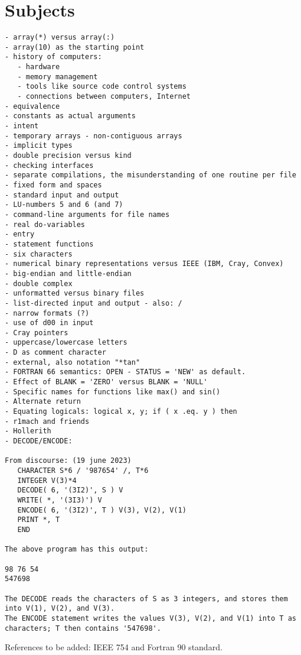 \documentclass{article}
\begin{document}
\section{Subjects}
\begin{verbatim}
- array(*) versus array(:)
- array(10) as the starting point
- history of computers:
   - hardware
   - memory management
   - tools like source code control systems
   - connections between computers, Internet
- equivalence
- constants as actual arguments
- intent
- temporary arrays - non-contiguous arrays
- implicit types
- double precision versus kind
- checking interfaces
- separate compilations, the misunderstanding of one routine per file
- fixed form and spaces
- standard input and output
- LU-numbers 5 and 6 (and 7)
- command-line arguments for file names
- real do-variables
- entry
- statement functions
- six characters
- numerical binary representations versus IEEE (IBM, Cray, Convex)
- big-endian and little-endian
- double complex
- unformatted versus binary files
- list-directed input and output - also: /
- narrow formats (?)
- use of d00 in input
- Cray pointers
- uppercase/lowercase letters
- D as comment character
- external, also notation "*tan"
- FORTRAN 66 semantics: OPEN - STATUS = 'NEW' as default.
- Effect of BLANK = 'ZERO' versus BLANK = 'NULL'
- Specific names for functions like max() and sin()
- Alternate return
- Equating logicals: logical x, y; if ( x .eq. y ) then
- r1mach and friends
- Hollerith
- DECODE/ENCODE:

From discourse: (19 june 2023)
   CHARACTER S*6 / '987654' /, T*6
   INTEGER V(3)*4
   DECODE( 6, '(3I2)', S ) V
   WRITE( *, '(3I3)') V
   ENCODE( 6, '(3I2)', T ) V(3), V(2), V(1)
   PRINT *, T
   END

The above program has this output:

98 76 54
547698

The DECODE reads the characters of S as 3 integers, and stores them into V(1), V(2), and V(3).
The ENCODE statement writes the values V(3), V(2), and V(1) into T as characters; T then contains '547698'.

\end{verbatim}


References to be added: IEEE 754 and Fortran 90 standard.
\end{document}
